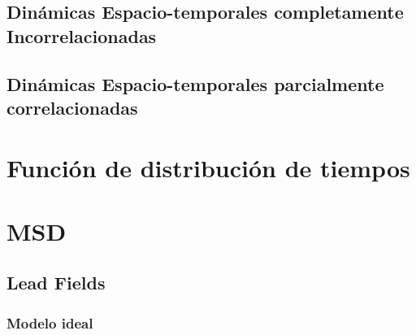\subsection{Dinámicas Espacio-temporales completamente Incorrelacionadas}

%
%

\subsection{Dinámicas Espacio-temporales parcialmente correlacionadas}


\section{Función de distribución de tiempos}



\section{\acf{MSD}}

\subsection{Lead Fields}

\subsubsection{Modelo ideal}

